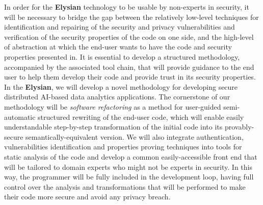 \documentclass[a4paper,11pt]{article}
\newcommand{\project}[1]{\textbf{#1}\xspace}
\newcommand{\SECURITY}{\project{Elysian}}
\newcommand{\TheProject}{\SECURITY}
\begin{document}
In order for the \TheProject{} technology to be usable by non-experts in security, it will be necessary to bridge the gap between the relatively low-level techniques for identification and repairing of the security and privacy vulnerabilities and verification of the security properties of the code on one side, and the high-level of abstraction at which the end-user wants to have the code and security properties presented in. It is essential to develop a structured methodology, accompanied by the associated tool chain, that will provide guidance to the end user to help them develop their code and provide trust in its security properties. In the \TheProject{}, we will develop a novel methodology for developing secure distributed AI-based data analytics applications. The cornerstone of our methodology will be \emph{software refactoring} as a method for user-guided semi-automatic structured rewriting of the end-user code, which will enable easily understandable step-by-step transformation of the initial code into its provably-secure semantically-equivalent version. We will also integrate authentication, vulnerabilities identification and properties proving techniques into tools for static analysis of the code and develop a common easily-accessible front end that will be tailored to domain experts who might not be experts in security. In this way, the programmer will be fully included in the development loop, having full control over the analysis and transformations that will be performed to make their code more secure and avoid any privacy breach. 
\end{document}
